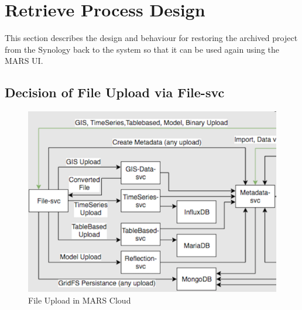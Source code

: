 \section{Retrieve Process Design}
This section describes the design and behaviour for restoring the archived project from the Synology back to the system
so that it can be used again using the MARS UI.   

\subsection{Decision of File Upload via File-svc}
\label{ssec:file}

\begin{figure}[H]
    \centering \includegraphics[scale=0.4]{grafiken/mars-cloud.png}
    \caption{File Upload in MARS Cloud \cite{MARSCLoud}}
    \label{fig:MARSCloud}
\end{figure}

